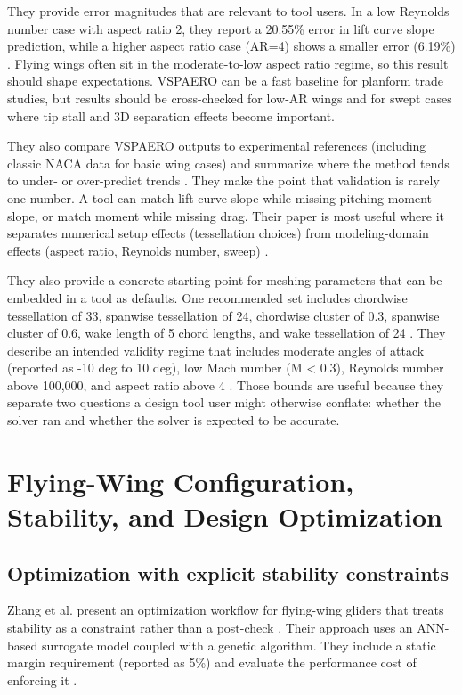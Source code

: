 They provide error magnitudes that are relevant to tool users. In a low Reynolds number case with aspect ratio 2, they report a 20.55\% error in lift curve slope prediction, while a higher aspect ratio case (AR=4) shows a smaller error (6.19\%) \cite{RosasCordova2024VSPAERO}. Flying wings often sit in the moderate-to-low aspect ratio regime, so this result should shape expectations. VSPAERO can be a fast baseline for planform trade studies, but results should be cross-checked for low-AR wings and for swept cases where tip stall and 3D separation effects become important.

They also compare VSPAERO outputs to experimental references (including classic NACA data for basic wing cases) and summarize where the method tends to under- or over-predict trends \cite{RosasCordova2024VSPAERO}. They make the point that validation is rarely one number. A tool can match lift curve slope while missing pitching moment slope, or match moment while missing drag. Their paper is most useful where it separates numerical setup effects (tessellation choices) from modeling-domain effects (aspect ratio, Reynolds number, sweep) \cite{RosasCordova2024VSPAERO}.

They also provide a concrete starting point for meshing parameters that can be embedded in a tool as defaults. One recommended set includes chordwise tessellation of 33, spanwise tessellation of 24, chordwise cluster of 0.3, spanwise cluster of 0.6, wake length of 5 chord lengths, and wake tessellation of 24 \cite{RosasCordova2024VSPAERO}. They describe an intended validity regime that includes moderate angles of attack (reported as -10 deg to 10 deg), low Mach number (M < 0.3), Reynolds number above 100,000, and aspect ratio above 4 \cite{RosasCordova2024VSPAERO}. Those bounds are useful because they separate two questions a design tool user might otherwise conflate: whether the solver ran and whether the solver is expected to be accurate.

\chapter{Flying-Wing Configuration, Stability, and Design Optimization}
\section{Optimization with explicit stability constraints}
Zhang et al. present an optimization workflow for flying-wing gliders that treats stability as a constraint rather than a post-check \cite{Zhang2025ANNGA}. Their approach uses an ANN-based surrogate model coupled with a genetic algorithm. They include a static margin requirement (reported as 5\%) and evaluate the performance cost of enforcing it \cite{Zhang2025ANNGA}.

